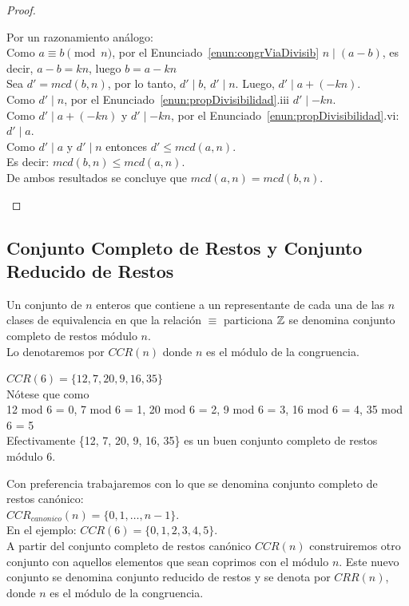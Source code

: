 \begin{proof}
\begin{enumerate}[label=\roman*)]
Por un razonamiento análogo: \\
Como $a \equiv b \pmod n$, por el Enunciado~\ref{enun:congrViaDivisib} $n \mid (a-b)$, es decir, $a - b = kn$, luego  $b = a-kn$\\
Sea $d' = mcd(b,n)$, por lo tanto, $d' \mid b$, $d' \mid n$. Luego, $d' \mid a+(-kn)$. \\
Como $d' \mid n$, por el Enunciado~\ref{enun:propDivisibilidad}.iii $d' \mid -kn$. \\ 
Como $d' \mid a+(-kn)$ y $d' \mid -kn$, por el Enunciado~\ref{enun:propDivisibilidad}.vi: $d' \mid a$. \\
Como $d' \mid a$ y $d' \mid n$ entonces $d' \leq mcd(a,n)$. \\
Es decir: $mcd(b,n) \leq mcd(a,n)$. \\
De ambos resultados se concluye que $mcd(a,n) = mcd(b,n)$.
\end{enumerate}
\end{proof}

\subsection{Conjunto Completo de Restos y Conjunto Reducido de Restos}
Un conjunto de $n$ enteros que contiene a un representante de cada una de las $n$ clases de equivalencia en que la relación $\equiv$ particiona $\mathbb{Z}$ se denomina conjunto completo de restos módulo $n$.\\
Lo denotaremos por $CCR(n)$ donde $n$ es el módulo de la congruencia.

\begin{ejemplo}
$CCR(6) = \{12, 7, 20, 9, 16, 35\}$ \\
Nótese que como \\
12 mod 6 = 0, 7 mod 6 = 1, 20 mod 6 = 2, 9 mod 6 = 3, 16 mod 6 = 4, 35 mod 6 = 5 \\
Efectivamente \{12, 7, 20, 9, 16, 35\} es un buen conjunto completo de restos módulo 6.
\end{ejemplo}

Con preferencia trabajaremos con lo que se denomina conjunto
completo de restos canónico:\\
$CCR_{canonico}(n) = \{ 0, 1, \dots , n-1 \}$.\\
En el ejemplo: $CCR(6) = \{0, 1, 2, 3, 4, 5\}$. \\

A partir del conjunto completo de restos canónico $CCR(n)$ construiremos otro conjunto con aquellos elementos que sean coprimos con el módulo $n$.
Este nuevo conjunto se denomina conjunto reducido de restos y se denota por 
$CRR(n)$, donde $n$ es el módulo de la congruencia.

